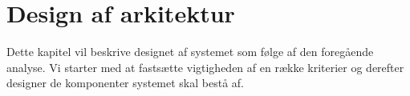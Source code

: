 \chapter{Design af arkitektur}
\label{chap:design}
Dette kapitel vil beskrive designet af systemet som følge af den foregående analyse. Vi starter med at fastsætte vigtigheden af en række kriterier og derefter designer de komponenter systemet skal bestå af.



